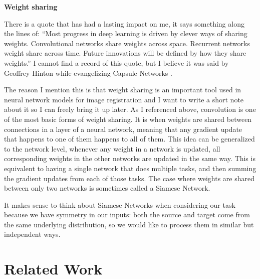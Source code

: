 \documentclass[12pt,a4paper]{article}
\begin{document}
{\bf Weight sharing}

There is a quote that has had a lasting impact on me, it says something along the lines of: ``Most progress in deep learning  is driven by clever ways of sharing weights. Convolutional networks share weights across space. Recurrent networks weight share across time. Future innovations will be defined by how they share weights.'' I cannot find a record of this quote, but I believe it was said by Geoffrey Hinton while evangelizing Capsule Networks \cite{capsule}.

The reason I mention this is that weight sharing is an important tool used in neural network models for image registration and I want to write a short note about it so I can freely bring it up later. As I referenced above, convolution is one of the most basic forms of weight sharing. It is when weights are shared between connections in a layer of a neural network, meaning that any gradient update that happens to one of them happens to all of them. This idea can be generalized to the network level, whenever any weight in a network is updated, all corresponding weights in the other networks are updated in the same way. This is equivalent to having a single network that does multiple tasks, and then summing the gradient updates from each of those tasks. The case where weights are shared between only two networks is sometimes called a Siamese Network.

It makes sense to think about Siamese Networks when considering our task because we have symmetry in our inputs: both the source and target come from the same underlying distribution, so we would like to process them in similar but independent ways.

\newpage



\section{Related Work}
\end{document}
